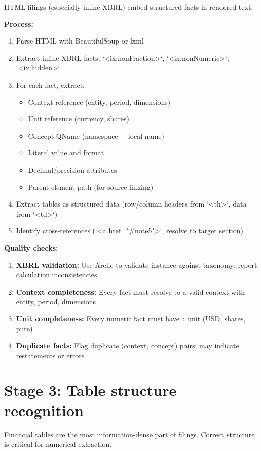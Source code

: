 HTML filings (especially inline XBRL) embed structured facts in rendered text.

\textbf{Process:}
\begin{enumerate}
\item Parse HTML with BeautifulSoup or lxml
\item Extract inline XBRL facts: `<ix:nonFraction>`, `<ix:nonNumeric>`, `<ix:hidden>`
\item For each fact, extract:
  \begin{itemize}
  \item Context reference (entity, period, dimensions)
  \item Unit reference (currency, shares)
  \item Concept QName (namespace + local name)
  \item Literal value and format
  \item Decimal/precision attributes
  \item Parent element path (for source linking)
  \end{itemize}
\item Extract tables as structured data (row/column headers from `<th>`, data from `<td>`)
\item Identify cross-references (`<a href="#note5">`, resolve to target section)
\end{enumerate}

\textbf{Quality checks:}
\begin{enumerate}
\item \textbf{XBRL validation:} Use Arelle to validate instance against taxonomy;
  report calculation inconsistencies
\item \textbf{Context completeness:} Every fact must resolve to a valid context
  with entity, period, dimensions
\item \textbf{Unit completeness:} Every numeric fact must have a unit (USD, shares, pure)
\item \textbf{Duplicate facts:} Flag duplicate (context, concept) pairs; may indicate
  restatements or errors
\end{enumerate}

\section{Stage 3: Table structure recognition}

Financial tables are the most information-dense part of filings. Correct structure
is critical for numerical extraction.

